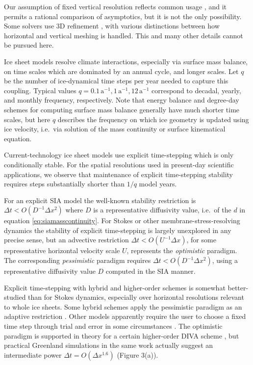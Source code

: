 \documentclass[review,letterpaper]{igs}
\begin{document}
Our assumption of fixed vertical resolution reflects common usage \citep[for example]{Aschwandenetal2019,BrinkerhoffJohnson2015,Hoffmanetal2018,Lengetal2012,
Winkelmannetal2011}, and it permits a rational comparison of asymptotics, but it is not the only possibility.  Some solvers use 3D refinement \citep{BrownSmithAhmadia2013,IsaacStadlerGhattas2015,Tuminaroetal2016}, with various distinctions between how horizontal and vertical meshing is handled.  This and many other details cannot be pursued here.

Ice sheet models resolve climate interactions, especially via surface mass balance, on time scales which are dominated by an annual cycle, and longer scales.  Let $q$ be the number of ice-dynamical time steps per year needed to capture this coupling.  Typical values $q=0.1 \,\text{a}^{-1}, 1 \,\text{a}^{-1}, 12 \,\text{a}^{-1}$ correspond to decadal, yearly, and monthly frequency, respectively.  Note that energy balance and degree-day schemes for computing surface mass balance generally have much shorter time scales, but here $q$ describes the frequency on which ice geometry is updated using ice velocity, i.e.~via solution of the mass continuity or surface kinematical equation.

Current-technology ice sheet models use explicit time-stepping which is only conditionally stable.  For the spatial resolutions used in present-day scientific applications, we observe that maintenance of explicit time-stepping stability requires steps substantially shorter than $1/q$ model years.

For an explicit SIA model the well-known stability restriction is $\Delta t < O(D^{-1} \Delta x^2)$ \citep{Bueleretal2005,HindmarshPayne1996} where $D$ is a representative diffusivity value, i.e.~of the $d$ in equation \eqref{eq:siamasscontinuity}.  For Stokes or other membrane-stress-resolving dynamics the stability of explicit time-stepping is largely unexplored in any precise sense, but an advective restriction $\Delta t < O(U^{-1} \Delta x)$, for some representative horizontal velocity scale $U$, represents the \emph{optimistic} paradigm.  The corresponding \emph{pessimistic} paradigm requires $\Delta t < O(D^{-1} \Delta x^2)$, using a representative diffusivity value $D$ computed in the SIA manner.

Explicit time-stepping with hybrid and higher-order schemes is somewhat better-studied than for Stokes dynamics, especially over horizontal resolutions relevant to whole ice sheets.  Some hybrid schemes apply the pessimistic paradigm as an adaptive restriction \citep{Winkelmannetal2011}.  Other models apparently require the user to choose a fixed time step through trial and error in some circumstances \citep[for example]{Fischleretal2022,Robinsonetal2022}.  The optimistic paradigm is supported in theory for a certain higher-order DIVA scheme \citep[see equation (52)]{Robinsonetal2022}, but practical Greenland simulations in the same work actually suggest an intermediate power $\Delta t = O(\Delta x^{1.6})$ (Figure 3(a)).
\end{document}
